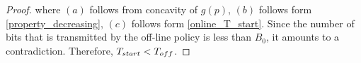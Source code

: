 \begin{proof}
where $(a)$ follows from concavity of $g(p)$, $(b)$ follows form \eqref{property_decreasing}, $(c)$ follows form \eqref{online_T_start}. Since the number of bits that is transmitted by the off-line policy is less than $B_0$, it amounts to a contradiction. Therefore, $T_{\mbox{\scriptsize{start}}}<T_{\mbox{\scriptsize{off}}}$.

%


\end{proof}
